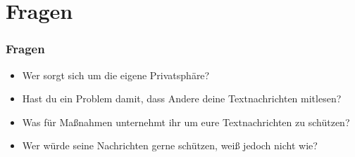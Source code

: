 \section*{Fragen}

\begin{frame}
  \frametitle{Fragen}

  \begin{itemize}
   \item Wer sorgt sich um die eigene Privatsphäre?
   \pause
   \item Hast du ein Problem damit, dass Andere deine Textnachrichten mitlesen?
   \pause
   \item Was für Maßnahmen unternehmt ihr um eure Textnachrichten zu schützen?
   \pause
   \item Wer würde seine Nachrichten gerne schützen, weiß jedoch nicht wie?
  \end{itemize}

\end{frame}

